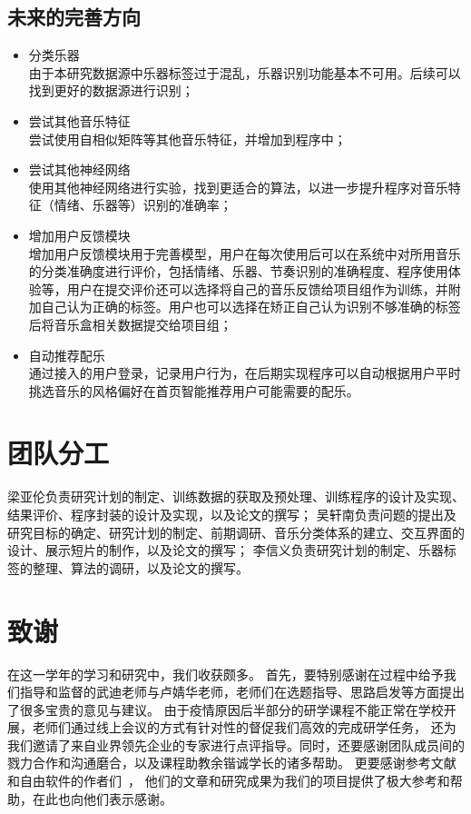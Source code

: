 \documentclass[a4paper,utf8,10pt]{article}
\newcommand{\sept}{\setlength\itemsep{-4pt}}
\begin{document}
\subsection{未来的完善方向}
\begin{itemize}
  \sept
  \item 分类乐器\\
  由于本研究数据源中乐器标签过于混乱，乐器识别功能基本不可用。后续可以找到更好的数据源进行识别；
  \item 尝试其他音乐特征\\
  尝试使用自相似矩阵等其他音乐特征，并增加到程序中；
  \item 尝试其他神经网络\\
  使用其他神经网络进行实验，找到更适合的算法，以进一步提升程序对音乐特征（情绪、乐器等）识别的准确率；
  \item 增加用户反馈模块\\
  增加用户反馈模块用于完善模型，用户在每次使用后可以在系统中对所用音乐的分类准确度进行评价，包括情绪、乐器、节奏识别的准确程度、程序使用体验等，用户在提交评价还可以选择将自己的音乐反馈给项目组作为训练，并附加自己认为正确的标签。用户也可以选择在矫正自己认为识别不够准确的标签后将音乐盒相关数据提交给项目组；
  \item 自动推荐配乐\\
  通过接入的用户登录，记录用户行为，在后期实现程序可以自动根据用户平时挑选音乐的风格偏好在首页智能推荐用户可能需要的配乐。
\end{itemize}

\section{团队分工}

梁亚伦负责研究计划的制定、训练数据的获取及预处理、训练程序的设计及实现、结果评价、程序封装的设计及实现，以及论文的撰写；
吴轩南负责问题的提出及研究目标的确定、研究计划的制定、前期调研、音乐分类体系的建立、交互界面的设计、展示短片的制作，以及论文的撰写；
李信义负责研究计划的制定、乐器标签的整理、算法的调研，以及论文的撰写。

\section{致谢}

在这一学年的学习和研究中，我们收获颇多。
首先，要特别感谢在过程中给予我们指导和监督的武迪老师与卢婧华老师，老师们在选题指导、思路启发等方面提出了很多宝贵的意见与建议。
由于疫情原因后半部分的研学课程不能正常在学校开展，老师们通过线上会议的方式有针对性的督促我们高效的完成研学任务，
还为我们邀请了来自业界领先企业的专家进行点评指导。同时，还要感谢团队成员间的戮力合作和沟通磨合，以及课程助教余锴诚学长的诸多帮助。
更要感谢参考文献和自由软件的作者们~\cite{tf15}\cite{CC01a}\cite{lstm15}\cite{boixx14}\cite{librosa18}\cite{lstm18}，
他们的文章和研究成果为我们的项目提供了极大参考和帮助，在此也向他们表示感谢。

{}

\end{document}
